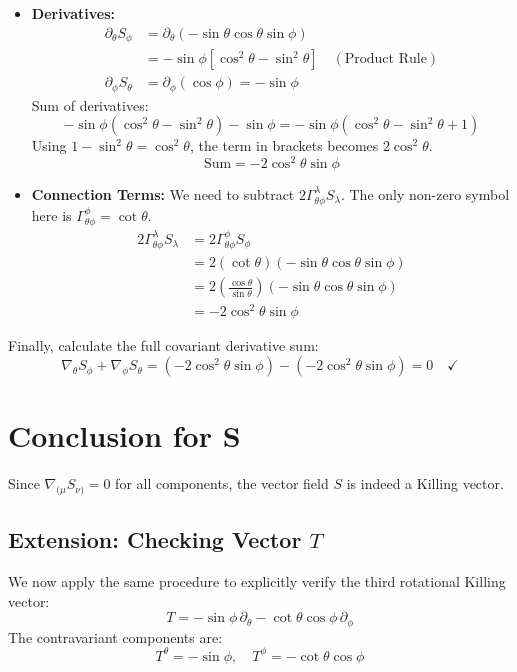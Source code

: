 \documentclass[11pt, a4paper]{report}
\begin{document}
\begin{itemize}
    \item \textbf{Derivatives:}
    \begin{align*}
    \partial_\theta S_\phi &= \partial_\theta(-\sin\theta\cos\theta\sin\phi) \\
    &= -\sin\phi [\cos^2\theta - \sin^2\theta] \quad (\text{Product Rule}) \\
    \partial_\phi S_\theta &= \partial_\phi(\cos\phi) = -\sin\phi
    \end{align*}
    Sum of derivatives:
    \begin{equation*}
    -\sin\phi(\cos^2\theta - \sin^2\theta) - \sin\phi = -\sin\phi(\cos^2\theta - \sin^2\theta + 1)
    \end{equation*}
    Using $1 - \sin^2\theta = \cos^2\theta$, the term in brackets becomes $2\cos^2\theta$.
    \begin{equation}
    \text{Sum} = -2\cos^2\theta\sin\phi
    \end{equation}

    \item \textbf{Connection Terms:}
    We need to subtract $2\Gamma^\lambda_{\theta\phi} S_\lambda$. The only non-zero symbol here is $\Gamma^\phi_{\theta\phi} = \cot\theta$.
    \begin{align*}
    2\Gamma^\lambda_{\theta\phi} S_\lambda &= 2 \Gamma^\phi_{\theta\phi} S_\phi \\
    &= 2 (\cot\theta) (-\sin\theta\cos\theta\sin\phi) \\
    &= 2 \left(\frac{\cos\theta}{\sin\theta}\right) (-\sin\theta\cos\theta\sin\phi) \\
    &= -2 \cos^2\theta \sin\phi
    \end{align*}
\end{itemize}

Finally, calculate the full covariant derivative sum:
\begin{equation}
\nabla_\theta S_\phi + \nabla_\phi S_\theta = (-2\cos^2\theta\sin\phi) - (-2\cos^2\theta\sin\phi) = 0 \quad \checkmark
\end{equation}

\section*{Conclusion for S}
Since $\nabla_{(\mu} S_{\nu)} = 0$ for all components, the vector field $S$ is indeed a Killing vector.

\subsection*{Extension: Checking Vector \(T\)}
We now apply the same procedure to explicitly verify the third rotational Killing vector:
\begin{equation}
T = -\sin\phi \,\partial_\theta - \cot\theta \cos\phi \,\partial_\phi
\end{equation}
The contravariant components are:
\begin{equation}
T^\theta = -\sin\phi, \quad T^\phi = -\cot\theta \cos\phi
\end{equation}
\end{document}
